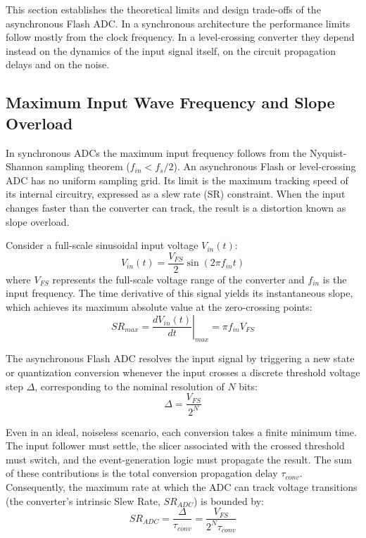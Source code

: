 This section establishes the theoretical limits and design trade-offs of the asynchronous Flash ADC. In a synchronous architecture the performance limits follow mostly from the clock frequency. In a level-crossing converter they depend instead on the dynamics of the input signal itself, on the circuit propagation delays and on the noise.

\subsection{Maximum Input Wave Frequency and Slope Overload}
\label{subsec:slope_overload}

In synchronous ADCs the maximum input frequency follows from the Nyquist-Shannon sampling theorem ($f_{in} < f_s / 2$). An asynchronous Flash or level-crossing ADC has no uniform sampling grid. Its limit is the maximum tracking speed of its internal circuitry, expressed as a slew rate (SR) constraint. When the input changes faster than the converter can track, the result is a distortion known as slope overload.

Consider a full-scale sinusoidal input voltage $V_{in}(t)$:
\begin{equation}
    V_{in}(t) = \frac{V_{FS}}{2} \sin(2\pi f_{in} t)
\end{equation}
where $V_{FS}$ represents the full-scale voltage range of the converter and $f_{in}$ is the input frequency. The time derivative of this signal yields its instantaneous slope, which achieves its maximum absolute value at the zero-crossing points:
\begin{equation}
    SR_{max} = \left. \frac{dV_{in}(t)}{dt} \right|_{max} = \pi f_{in} V_{FS}
\end{equation}

The asynchronous Flash ADC resolves the input signal by triggering a new state or quantization conversion whenever the input crosses a discrete threshold voltage step $\Delta$, corresponding to the nominal resolution of $N$ bits:
\begin{equation}
    \Delta = \frac{V_{FS}}{2^N}
\end{equation}

Even in an ideal, noiseless scenario, each conversion takes a finite minimum time. The input follower must settle, the slicer associated with the crossed threshold must switch, and the event-generation logic must propagate the result. The sum of these contributions is the total conversion propagation delay $\tau_{conv}$. Consequently, the maximum rate at which the ADC can track voltage transitions (the converter's intrinsic Slew Rate, $SR_{ADC}$) is bounded by:
\begin{equation}
    SR_{ADC} = \frac{\Delta}{\tau_{conv}} = \frac{V_{FS}}{2^N \tau_{conv}}
\end{equation}

